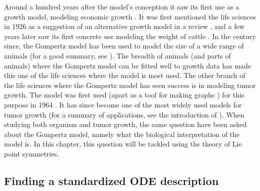 Around a hundred years after the model's conception it saw its first use as a growth model, modeling economic growth \cite{prescott1922demand,peabody1924railway}.
It was first mentioned the life sciences in 1926 as a suggestion of an alternative growth model in a review \cite{wright1926reviews}, and a few years later saw its first concrete use modeling the weight of cattle \cite{davidson1928growth}.
In the century since, the Gompertz model has been used to model the size of a wide range of animals (for a good summary, see \cite{tjorve2017gompertz}).
The breadth of animals (and parts of animals) where the Gompertz model can be fitted well to growth data has made this one of the life sciences where the model is most used.
The other branch of the life sciences where the Gompertz model has seen success is in modeling tumor growth.
The model was first used (apart as a tool for making graphs \cite{casey1934alteration}) for this purpose in 1964 \cite{laird1964dynamics}.
It has since become one of the most widely used models for tumor growth \cite{gerlee2013muddle} (for a summary of applications, see the introduction of \cite{benzekry2014classical}).
When studying both organism and tumor growth, the same question have been asked about the Gompertz model, namely what the biological interpretation of the model is.
In this chapter, this question will be tackled using the theory of Lie point symmetries.

\subsection{Finding a standardized ODE description}

